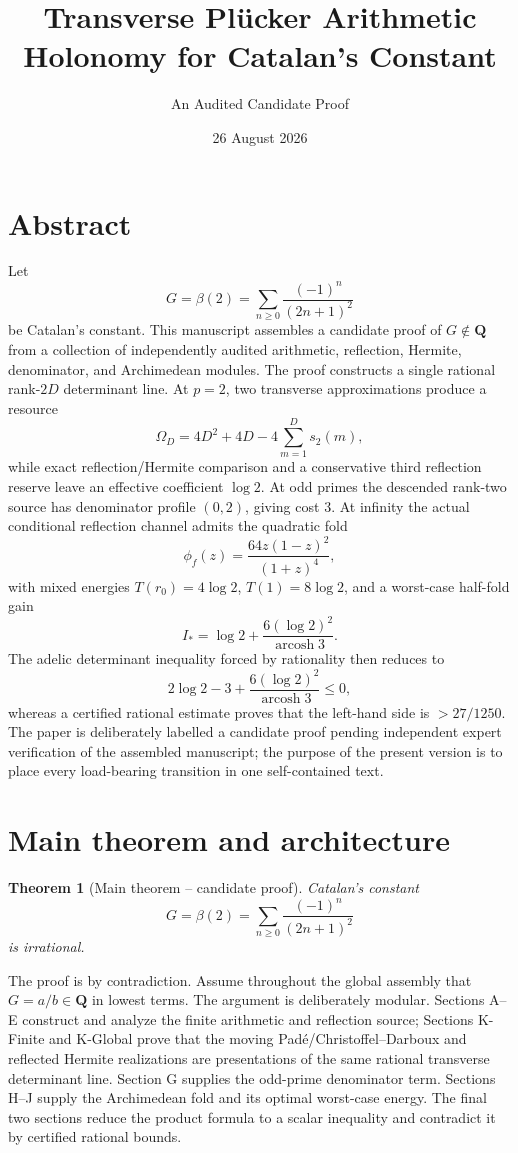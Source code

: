 \documentclass[
  10pt,
  letterpaper,
]{article}
\title{Transverse Plücker Arithmetic Holonomy for Catalan's Constant}
\subtitle{An Audited Candidate Proof}
\author{}
\date{26 August 2026}
\newtheorem{theorem}{Theorem}[section]
\theoremstyle{definition}
\theoremstyle{remark}
\begin{document}
\maketitle

{
\setcounter{tocdepth}{2}
\tableofcontents
}
\section{Abstract}\label{abstract}

Let \[
G=\beta(2)=\sum_{n\ge0}\frac{(-1)^n}{(2n+1)^2}
\] be Catalan's constant. This manuscript assembles a candidate proof of
\(G\notin\mathbf Q\) from a collection of independently audited
arithmetic, reflection, Hermite, denominator, and Archimedean modules.
The proof constructs a single rational rank-\(2D\) determinant line. At
\(p=2\), two transverse approximations produce a resource \[
\Omega_D=4D^2+4D-4\sum_{m=1}^D s_2(m),
\] while exact reflection/Hermite comparison and a conservative third
reflection reserve leave an effective coefficient \(\log2\). At odd
primes the descended rank-two source has denominator profile \((0,2)\),
giving cost \(3\). At infinity the actual conditional reflection channel
admits the quadratic fold \[
\phi_f(z)=\frac{64z(1-z)^2}{(1+z)^4},
\] with mixed energies \(T(r_0)=4\log2\), \(T(1)=8\log2\), and a
worst-case half-fold gain \[
I_*=\log2+\frac{6(\log2)^2}{\operatorname{arcosh}3}.
\] The adelic determinant inequality forced by rationality then reduces
to \[
2\log2-3+\frac{6(\log2)^2}{\operatorname{arcosh}3}\le0,
\] whereas a certified rational estimate proves that the left-hand side
is \(>27/1250\). The paper is deliberately labelled a candidate proof
pending independent expert verification of the assembled manuscript; the
purpose of the present version is to place every load-bearing transition
in one self-contained text.

\section{Main theorem and
architecture}\label{main-theorem-and-architecture}

\begin{theorem}[Main theorem -- candidate proof]\label{thm:main}
Catalan's constant
\[
G=\beta(2)=\sum_{n\ge0}\frac{(-1)^n}{(2n+1)^2}
\]
is irrational.
\end{theorem}

The proof is by contradiction. Assume throughout the global assembly
that \(G=a/b\in\mathbf Q\) in lowest terms. The argument is deliberately
modular. Sections A--E construct and analyze the finite arithmetic and
reflection source; Sections K-Finite and K-Global prove that the moving
Padé/Christoffel--Darboux and reflected Hermite realizations are
presentations of the same rational transverse determinant line. Section
G supplies the odd-prime denominator term. Sections H--J supply the
Archimedean fold and its optimal worst-case energy. The final two
sections reduce the product formula to a scalar inequality and
contradict it by certified rational bounds.
\end{document}
